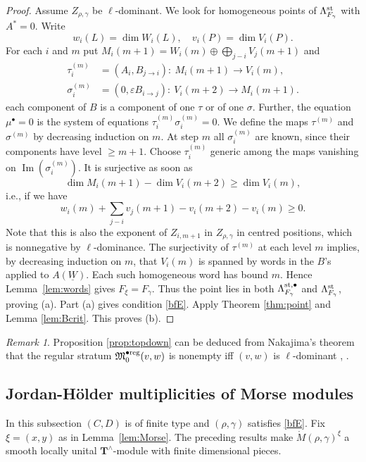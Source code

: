 \documentclass[11pt,reqno]{amsart}
\theoremstyle{definition}
\theoremstyle{remark}
\newtheorem{Remark}[Theorem]{Remark}
\def\dW{\underline W}
\def\bT{\mathbf T}
\def\M{\mathfrak M}
\begin{document}
\begin{proof}
Assume $Z_{\rho,\gamma}$ be $\ell$-dominant.
We look for homogeneous points of $\Lambda_{F_\gamma}^{\rm st}$ with $A^*=0$. Write 
$$w_i(L)=\dim W_i(L),\quad v_i(P)=\dim V_i(P).$$ 
For each $i$ and $m$ put $M_i(m+1)=W_i(m)\oplus\textstyle\bigoplus_{j-i}V_j(m+1)$ and
\begin{align*}
\tau_i^{(m)}&=(A_i,B_{j\to i}):\ M_i(m+1)\to V_i(m),\\
\sigma_i^{(m)}&=(0,\varepsilon B_{i\to j}):\ V_i(m+2)\to M_i(m+1).
\end{align*}
each component of $B$ is a component of  one $\tau$ or of  one $\sigma$.
Further, the equation
$\mu^\bullet=0$ is the system of equations $\tau^{(m)}_i\sigma^{(m)}_i=0$. 
We define the maps $\tau^{(m)}$ and $\sigma^{(m)}$
by decreasing induction on $m$. At step $m$ all $\sigma^{(m)}_i$ are known,
since their components have level $\geqslant m+1$.
Choose $\tau^{(m)}_i$ generic among the maps vanishing on $\operatorname{Im}(\sigma^{(m)}_i)$. It is
surjective as soon as 
$$\dim M_i(m+1)-\dim V_i(m+2)\geqslant\dim V_i(m),$$ 
i.e., if we have
\[
w_i(m)+\textstyle\sum_{j-i}v_j(m+1)-v_i(m+2)-v_i(m)\geqslant0.
\]
Note that this is also
 the exponent of $Z_{i,m+1}$ in $Z_{\rho,\gamma}$ in centred positions, which is nonnegative by $\ell$-dominance. 
 The surjectivity of $\tau^{(m)}$ at each level $m$ implies, by decreasing induction on $m$, 
 that $V_i(m)$ is spanned by words in the $B$'s applied to $A(\dW)$.
Each such homogeneous word has bound $m$. Hence Lemma~\ref{lem:words} gives $F_\xi=F_\gamma$.
Thus the point lies in both $\Lambda_{F_\gamma}^{\rm st,\bullet}$ and $\Lambda^{\rm st}_{F_\gamma}$, proving (a).
Part (a) gives condition \eqref{bfE}.
Apply Theorem \ref{thm:point} and Lemma \ref{lem:Bcrit}.
This proves (b).
\end{proof}

\begin{Remark}
Proposition \ref{prop:topdown} can  be deduced from Nakajima's theorem that the regular stratum
$\M_0^{\bullet\rm reg}(v,w)$ is nonempty iff $(v,w)$ is $\ell$-dominant \cite{Nak01}, \cite[Prop.~2.4.9]{KQ14}.
\end{Remark}

\subsection{Jordan-H\"older multiplicities of Morse modules}\label{sec:JHMM}
In this subsection $(C,D)$ is of finite type and $(\rho,\gamma)$
satisfies \eqref{bfE}. Fix $\xi=(x,y)$ as in Lemma~\ref{lem:Morse}.
The preceding results make $\mathring M(\rho,\gamma)^\xi$ a smooth
locally unital $\bT^\wedge$-module with finite dimensional pieces.
\end{document}
